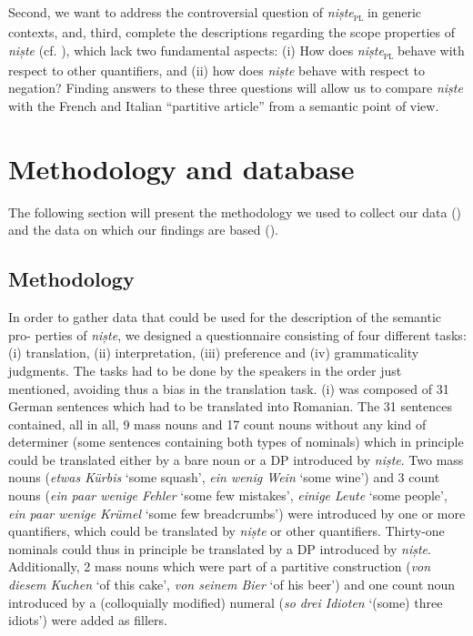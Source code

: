 \documentclass[output=paper,colorlinks,citecolor=brown]{langscibook}
\begin{document}
Second, we want to address the controversial question of \textit{niște}\textsubscript{\textsc{pl}} in generic contexts, and, third, complete the descriptions regarding the scope properties of \textit{niște} (cf. ), which lack two fundamental aspects: (i) How does \textit{niște}\textsubscript{\textsc{pl}} behave with respect to other quantifiers, and (ii) how does \textit{niște}\textsubscript{} behave with respect to negation? Finding answers to these three questions will allow us to compare \textit{niște}\textsubscript{} with the French and Italian “partitive article” from a semantic point of view.

\section{Methodology and database}\label{sec:ds3}
The following section will present the methodology we used to collect our data () and the data on which our findings are based ().

\subsection{Methodology}\label{sec:ds3.1}
In order to gather data that could be used for the description of the semantic pro- perties of \textit{niște}, we designed a questionnaire consisting of four different tasks: (i) translation, (ii) interpretation, (iii) preference and (iv) grammaticality judgments. The tasks had to be done by the speakers in the order just mentioned, avoiding thus a bias in the translation task. (i) was composed of 31 German sentences which had to be translated into Romanian. The 31 sentences contained, all in all, 9 mass nouns and 17 count nouns without any kind of determiner (some sentences containing both types of nominals) which in principle could be translated either by a bare noun or a DP introduced by \textit{niște}. Two mass nouns (\textit{etwas Kürbis} ‘some squash’, \textit{ein wenig Wein} ‘some wine’) and 3 count nouns (\textit{ein paar wenige Fehler} ‘some few mistakes’, \textit{einige Leute} ‘some people’, \textit{ein paar wenige Krümel} ‘some few breadcrumbs’) were introduced by one or more quantifiers, which could be translated by \textit{niște} or other quantifiers. Thirty-one nominals could thus in principle be translated by a DP introduced by \textit{niște}. Additionally, 2 mass nouns which were part of a partitive construction (\textit{von diesem Kuchen} ‘of this cake’, \textit{von seinem Bier} ‘of his beer’) and one count noun introduced by a (colloquially modified) numeral (\textit{so} \textit{drei Idioten} ‘(some) three idiots’) were added as fillers. 
\end{document}
